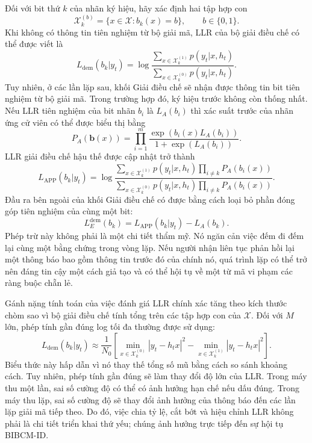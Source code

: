 Đối với bit thứ $k$ của nhãn ký hiệu, hãy xác định hai tập hợp con
\begin{equation}
  \mathcal{X}_{k}^{(b)}=\{x\in\mathcal{X}: b_k(x)=b\}, \qquad b\in\{0,1\}.
\end{equation}
Khi không có thông tin tiên nghiệm từ bộ giải mã, LLR của bộ giải điều chế có thể được viết là
\begin{equation}
  L_{\mathrm{dem}}(b_k|y_t)
  =\log\frac{\sum_{x\in\mathcal{X}_{k}^{(1)}}p(y_t|x,h_t)}
  {\sum_{x\in\mathcal{X}_{k}^{(0)}}p(y_t|x,h_t)}.
\end{equation}
Tuy nhiên, ở các lần lặp sau, khối Giải điều chế sẽ nhận được thông tin bit tiên nghiệm từ bộ giải mã. Trong trường hợp đó, ký hiệu trước không còn thống nhất. Nếu LLR tiên nghiệm của bit nhãn $b_i$ là $L_A(b_i)$ thì xác suất trước của nhãn ứng cử viên có thể được biểu thị bằng
\begin{equation}
  P_A(\mathbf{b}(x))=
  \prod_{i=1}^{m}
  \frac{\exp(b_i(x)L_A(b_i))}
  {1+\exp(L_A(b_i))}.
\end{equation}
LLR giải điều chế hậu thế được cập nhật trở thành
\begin{equation}
  L_{\mathrm{APP}}(b_k|y_t)
  =
  \log
  \frac{\sum_{x\in\mathcal{X}_{k}^{(1)}}p(y_t|x,h_t)
  \prod_{i\ne k} P_A(b_i(x))}
  {\sum_{x\in\mathcal{X}_{k}^{(0)}}p(y_t|x,h_t)
  \prod_{i\ne k} P_A(b_i(x))}.
\end{equation}
Đầu ra bên ngoài của khối Giải điều chế có được bằng cách loại bỏ phần đóng góp tiên nghiệm của cùng một bit:
\begin{equation}
  L_E^{\mathrm{dem}}(b_k)=L_{\mathrm{APP}}(b_k|y_t)-L_A(b_k).
\end{equation}
Phép trừ này không phải là một chi tiết thẩm mỹ. Nó ngăn cản việc đếm đi đếm lại cùng một bằng chứng trong vòng lặp. Nếu người nhận liên tục phản hồi lại một thông báo bao gồm thông tin trước đó của chính nó, quá trình lặp có thể trở nên đáng tin cậy một cách giả tạo và có thể hội tụ về một từ mã vi phạm các ràng buộc chẵn lẻ.

Gánh nặng tính toán của việc đánh giá LLR chính xác tăng theo kích thước chòm sao vì bộ giải điều chế tính tổng trên các tập hợp con của $\mathcal{X}$. Đối với $M$ lớn, phép tính gần đúng log tối đa thường được sử dụng:
\begin{equation}
  L_{\mathrm{dem}}(b_k|y_t)
  \approx
  \frac{1}{N_0}
  \left[
  \min_{x\in\mathcal{X}_{k}^{(0)}}|y_t-h_t x|^2
  -
  \min_{x\in\mathcal{X}_{k}^{(1)}}|y_t-h_t x|^2
  \right].
\end{equation}
Biểu thức này hấp dẫn vì nó thay thế tổng số mũ bằng cách so sánh khoảng cách. Tuy nhiên, phép tính gần đúng sẽ làm thay đổi độ lớn của LLR. Trong máy thu một lần, sai số cường độ có thể có ảnh hưởng hạn chế nếu dấu đúng. Trong máy thu lặp, sai số cường độ sẽ thay đổi ảnh hưởng của thông báo đến các lần lặp giải mã tiếp theo. Do đó, việc chia tỷ lệ, cắt bớt và hiệu chỉnh LLR không phải là chi tiết triển khai thứ yếu; chúng ảnh hưởng trực tiếp đến sự hội tụ BIBCM-ID.

